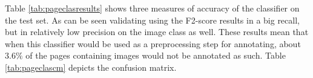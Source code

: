 Table \ref{tab:pageclasresults} shows three measures of accuracy of the
classifier on the test set. As can be seen validating using the F2-score
results in a big recall, but in relatively low precision on the image
class as well. These results mean that when this classifier would be used as a
preprocessing step for annotating, about $3.6\%$ of the pages containing images
would not be annotated as such. Table \ref{tab:pageclascm} depicts the confusion
matrix.


